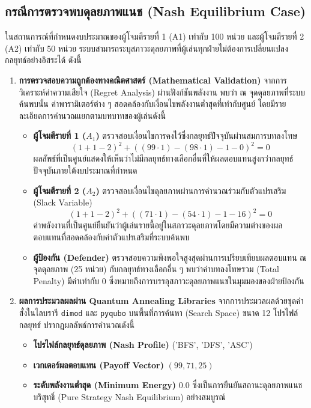 \subsection{กรณีการตรวจพบดุลยภาพแนช (Nash Equilibrium Case)}
ในสถานการณ์ที่กำหนดงบประมาณของผู้โจมตีรายที่ 1 (A1) เท่ากับ 100 หน่วย และผู้โจมตีรายที่ 2 (A2) เท่ากับ 50 หน่วย ระบบสามารถระบุสภาวะดุลยภาพที่ผู้เล่นทุกฝ่ายไม่ต้องการเปลี่ยนแปลงกลยุทธ์อย่างอิสระได้ ดังนี้
\begin{enumerate}
    \item \textbf{การตรวจสอบความถูกต้องทางคณิตศาสตร์ (Mathematical Validation)} 
    จากการวิเคราะห์ค่าความเสียใจ (Regret Analysis) ผ่านฟังก์ชันพลังงาน พบว่า ณ จุดดุลยภาพที่ระบบค้นพบนั้น ค่าพารามิเตอร์ต่าง ๆ สอดคล้องกับเงื่อนไขพลังงานต่ำสุดที่เท่ากับศูนย์ โดยมีรายละเอียดการคำนวณแยกตามบทบาทของผู้เล่นดังนี้

    \begin{itemize}
        \item \textbf{ผู้โจมตีรายที่ 1 ($A_1$)} ตรวจสอบเงื่อนไขการคงไว้ซึ่งกลยุทธ์ปัจจุบันผ่านสมการบทลงโทษ
        \begin{equation*}
            (1+1-2)^{2} + ((99 \cdot 1) - (98 \cdot 1) - 1 - 0)^{2} = 0
        \end{equation*}
        ผลลัพธ์ที่เป็นศูนย์แสดงให้เห็นว่าไม่มีกลยุทธ์ทางเลือกอื่นที่ให้ผลตอบแทนสูงกว่ากลยุทธ์ปัจจุบันภายใต้งบประมาณที่กำหนด

        \item \textbf{ผู้โจมตีรายที่ 2 ($A_2$)} ตรวจสอบเงื่อนไขดุลยภาพผ่านการคำนวณร่วมกับตัวแปรเสริม (Slack Variable)
        \begin{equation*}
            (1+1-2)^{2} + ((71 \cdot 1) - (54 \cdot 1) - 1 - 16)^{2} = 0
        \end{equation*}
        ค่าพลังงานที่เป็นศูนย์ยืนยันว่าผู้เล่นรายนี้อยู่ในสภาวะดุลยภาพโดยมีความต่างของผลตอบแทนที่สอดคล้องกับค่าตัวแปรเสริมที่ระบบค้นพบ

        \item \textbf{ผู้ป้องกัน (Defender)} ตรวจสอบความพึงพอใจสูงสุดผ่านการเปรียบเทียบผลตอบแทน ณ จุดดุลยภาพ (25 หน่วย) กับกลยุทธ์ทางเลือกอื่น ๆ พบว่าค่าบทลงโทษรวม (Total Penalty) มีค่าเท่ากับ 0 ซึ่งหมายถึงการบรรลุสภาวะดุลยภาพแนชในมุมมองของฝ่ายป้องกัน
    \end{itemize}

    \item \textbf{ผลการประมวลผลผ่าน Quantum Annealing Libraries}
    จากการประมวลผลด้วยชุดคำสั่งในไลบรารี \texttt{dimod} และ \texttt{pyqubo} บนพื้นที่การค้นหา (Search Space) ขนาด 12 โปรไฟล์กลยุทธ์ ปรากฏผลลัพธ์การคำนวณดังนี้
    \begin{itemize}
        \item \textbf{โปรไฟล์กลยุทธ์ดุลยภาพ (Nash Profile)} (\textsf{'BFS'}, \textsf{'DFS'}, \textsf{'ASC'})
        \item \textbf{เวกเตอร์ผลตอบแทน (Payoff Vector)} $(99, 71, 25)$
        \item \textbf{ระดับพลังงานต่ำสุด (Minimum Energy)} $0.0$ ซึ่งเป็นการยืนยันสถานะดุลยภาพแนชบริสุทธิ์ (Pure Strategy Nash Equilibrium) อย่างสมบูรณ์
    \end{itemize}
\end{enumerate}

